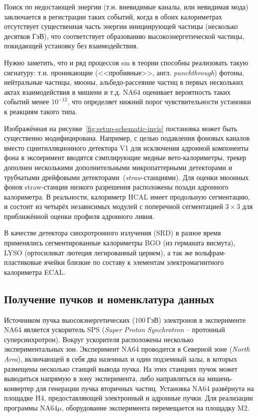Поиск по недостающей энергии (т.н. вневидимые каналы, или невидимая мода)
заключается в регистрации таких событий,
когда в обоих калориметрах отсутствует существенная часть энергии
инициирующей частицы (несколько десятков ГэВ), что соответствует
образованию высокоэнергетической частицы, покидающей
установку без взаимодействия.

Нужно заметить, что и ряд процессов \acrshort{sm} в теории способны
реализовать такую сигнатуру: т.н. проникающие (<<пробивные>>,
англ. \emph{punchthrough}) фотоны, нейтральные частицы, мюоны,
альбедо-рассеяние частиц в первых нескольких актах взаимодействия в
мишени и т.д. NA64 оценивает вероятность таких событий менее $10^{-12}$,
что определяет нижний порог чувствительности установки к реакциям такого
типа.

Изображённая на рисунке~\ref{fig:setup-schematic-invis} постановка
может быть существенно модифицирована. Например, с целью подавления фоновых
каналов вместо сцинтилляционного детектора V1 для исключения
адронной компоненты фона в эксперимент вводятся сэмплирующие
медные вето-калориметры, трекер дополнен несколькими дополнительными
микропаттерными детекторами и трубчатыми дрейфовыми
детекторами~(\emph{straw}-станциями). Для оценки мюонных фонов
straw-станции низкого разрешения расположены позади адронного калориметра.
В реальности, калориметр HCAL имеет продольную сегментацию, и состоит из
четырёх независимых модулей с поперечной сегментацией $3\times 3$ для
приближённой оценки профиля адронного ливня.

В качестве детектора синхротронного излучения (SRD) в разное время применялись
сегментированные калориметры BGO (из германата висмута), LYSO (ортосиликат
лютеция легированный церием), а так же вольфрам-пластиковые ячейки близкие
по составу к элементам электромагнитного калориметра ECAL.


\subsection{Получение пучков и номенклатура данных}

Источником пучка выосокэнергетических ($100~\text{ГэВ}$) электронов в
эксперименте NA64 является ускоритель SPS (\emph{Super Proton
Synchrotron} – протонный суперсинхротрон). Вокруг ускорителя расположены
несколько экспериментальных зон. Эксперимент NA64 проводится в
Северной зоне (\emph{North Area}), включающей в себя два наземных
и один подземный залы, в которых размещены несколько станций вывода
пучка. На этих станциях пучок может выводиться напрямую в зону
эксперимента, либо направляться на мишень-конвертер для генерации пучка
вторичных частиц. Установка NA64 развёрнута на площадке H4,
предоставляющей электронный и адронные пучки. Для
реализации программы $\text{NA64}\mu$, оборудование эксперимента перемещается на
площадку M2.

